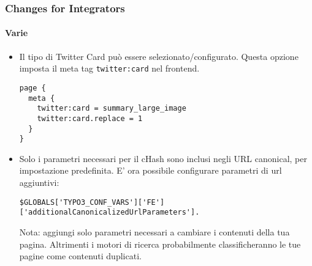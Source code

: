 \begin{frame}[fragile]
	\frametitle{Changes for Integrators}
	\framesubtitle{Varie}

	\lstset{basicstyle=\tiny\ttfamily}

	\begin{itemize}

		\item Il tipo di Twitter Card può essere selezionato/configurato.
			Questa opzione imposta il meta tag \texttt{twitter:card} nel frontend.

\begin{lstlisting}
page {
  meta {
    twitter:card = summary_large_image
    twitter:card.replace = 1
  }
}
\end{lstlisting}

		\item Solo i parametri necessari per il cHash sono inclusi negli URL canonical, per impostazione predefinita.
			E' ora possibile configurare parametri di url aggiuntivi:

\begin{lstlisting}
$GLOBALS['TYPO3_CONF_VARS']['FE']['additionalCanonicalizedUrlParameters'].
\end{lstlisting}

		\smaller
			Nota: aggiungi solo parametri necessari a cambiare i contenuti della tua pagina. Altrimenti i motori di ricerca probabilmente classificheranno le tue pagine come contenuti duplicati.
		\normalsize

	\end{itemize}

\end{frame}


